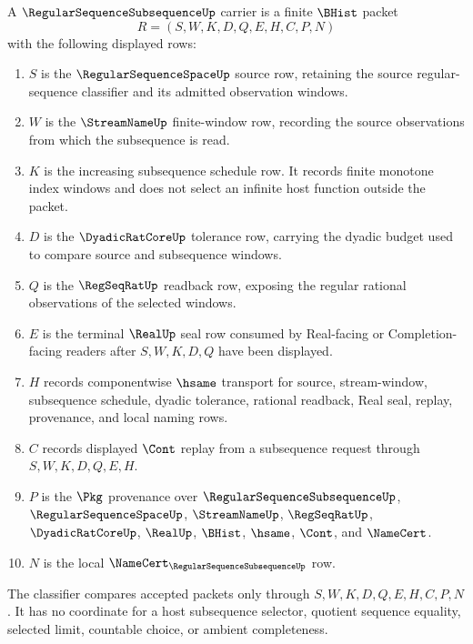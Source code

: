 \begin{definition}
\label{def:regular-sequence-subsequence-carrier}
A $\RegularSequenceSubsequenceUp$ carrier is a finite $\BHist$ packet
$$
R=(S,W,K,D,Q,E,H,C,P,N)
$$
with the following displayed rows:
\begin{enumerate}
\item $S$ is the $\RegularSequenceSpaceUp$ source row, retaining the source regular-sequence classifier and its admitted observation windows.
\item $W$ is the $\StreamNameUp$ finite-window row, recording the source observations from which the subsequence is read.
\item $K$ is the increasing subsequence schedule row. It records finite monotone index windows and does not select an infinite host function outside the packet.
\item $D$ is the $\DyadicRatCoreUp$ tolerance row, carrying the dyadic budget used to compare source and subsequence windows.
\item $Q$ is the $\RegSeqRatUp$ readback row, exposing the regular rational observations of the selected windows.
\item $E$ is the terminal $\RealUp$ seal row consumed by Real-facing or Completion-facing readers after $S,W,K,D,Q$ have been displayed.
\item $H$ records componentwise $\hsame$ transport for source, stream-window, subsequence schedule, dyadic tolerance, rational readback, Real seal, replay, provenance, and local naming rows.
\item $C$ records displayed $\Cont$ replay from a subsequence request through $S,W,K,D,Q,E,H$.
\item $P$ is the $\Pkg$ provenance over $\RegularSequenceSubsequenceUp$, $\RegularSequenceSpaceUp$, $\StreamNameUp$, $\RegSeqRatUp$, $\DyadicRatCoreUp$, $\RealUp$, $\BHist$, $\hsame$, $\Cont$, and $\NameCert$.
\item $N$ is the local $\NameCert_{\RegularSequenceSubsequenceUp}$ row.
\end{enumerate}
The classifier compares accepted packets only through $S,W,K,D,Q,E,H,C,P,N$. It has no coordinate for a host subsequence selector, quotient sequence equality, selected limit, countable choice, or ambient completeness.
\end{definition}

